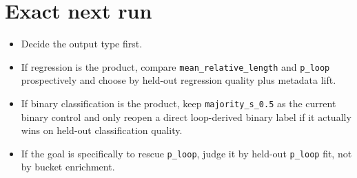 \documentclass[11pt]{article}
\begin{document}
\section*{Exact next run}
\begin{itemize}[leftmargin=1.5em]
\item Decide the output type first.
\item If regression is the product, compare \texttt{mean\_relative\_length} and
\texttt{p\_loop} prospectively and choose by held-out regression quality plus
metadata lift.
\item If binary classification is the product, keep \texttt{majority\_s\_0.5}
as the current binary control and only reopen a direct loop-derived binary label
if it actually wins on held-out classification quality.
\item If the goal is specifically to rescue \texttt{p\_loop}, judge it by
held-out \texttt{p\_loop} fit, not by bucket enrichment.
\end{itemize}
\end{document}
